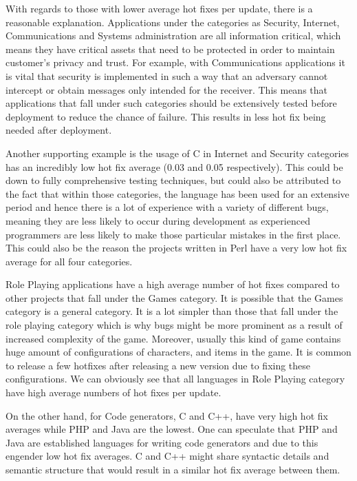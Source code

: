 \documentclass{sig-alternate}
\begin{document}
With regards to those with lower average hot fixes per update, there is a reasonable explanation. Applications under the categories as Security, Internet, Communications and Systems administration are all information critical, which means they have critical assets that need to be protected in order to maintain customer's privacy and trust. For example, with Communications applications it is vital that security is implemented in such a way that an adversary cannot intercept or obtain messages only intended for the receiver. This means that applications that fall under such categories should be extensively tested before deployment to reduce the chance of failure. This results in less hot fix being needed after deployment.

Another supporting example is the usage of C in Internet and Security categories has an incredibly low hot fix average (0.03 and 0.05 respectively). This could be down to fully comprehensive testing techniques, but could also be attributed to the fact that within those categories, the language has been used for an extensive period and hence there is a lot of experience with a variety of different bugs, meaning they are less likely to occur during development as experienced programmers are less likely to make those particular mistakes in the first place. This could also be the reason the projects written in Perl have a very low hot fix average for all four categories.

Role Playing applications have a high average number of hot fixes compared to other projects that fall under the Games category. It is possible that the Games category is a general category. It is a lot simpler than those that fall under the role playing category which is why bugs might be more prominent as a result of increased complexity of the game. Moreover, usually this kind of game contains huge amount of configurations of characters, and items in the game. It is common to release a few hotfixes after releasing a new version due to fixing these configurations. We can obviously see that all languages in Role Playing category have high average numbers of hot fixes per update.

On the other hand, for Code generators, C and C++, have very high hot fix averages while  PHP and Java are the lowest. One can speculate that PHP and Java are established languages for writing code generators and due to this engender low hot fix averages. C and C++ might share syntactic details and semantic structure that would result in a similar hot fix average between them.
\end{document}
